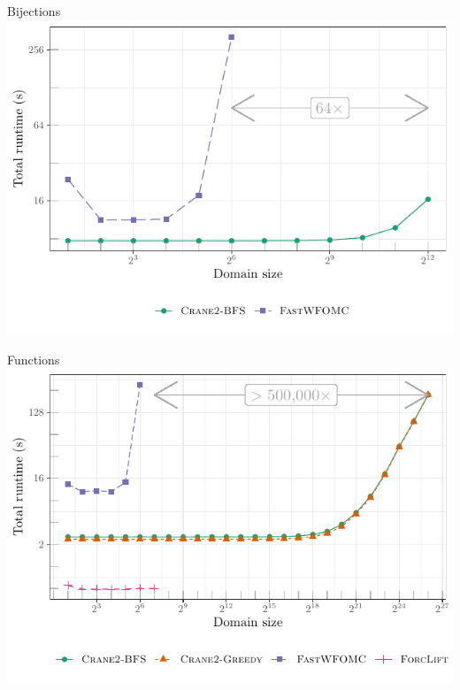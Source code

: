 \documentclass{beamer}
\begin{document}
\begin{frame}{Bijections}
  \centering
  \includegraphics{bijections.pdf}
\end{frame}

\begin{frame}{Functions}
  \centering
  \includegraphics{functions.pdf}
\end{frame}
\end{document}
